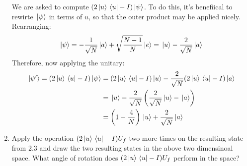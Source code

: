 \documentclass[10pt]{article}
\begin{document}
\begin{enumerate}[label=\alph*)]
			\begin{solution}
				We are asked to compute \( (2 \ket*{u}\bra*{u} - I) \ket*{\psi} \). To do this, it's benefiical 
				to rewirte \( \ket*{\psi} \) in terms of \( u \), so that the outer product may be applied nicely. 
				Rearranging:
				\[
				\ket*{\psi} = -\frac{1}{\sqrt{N} }\ket*{a} + \sqrt{\frac{N-1}{N}} \ket*{e}
				= \ket*{u} - \frac{2}{\sqrt{N} }\ket*{a}
				\] 
				Therefore, now applying the unitary:
				\begin{align*}
					\ket*{\psi'} = 
					(2 \ket*{u}\bra*{u} - I) \ket*{\psi} &= (2\ket*{u}\bra*{u} - I)\ket*{u} - \frac{2}{\sqrt{N} }
					(2\ket*{u}\bra*{u} - I)\ket*{a}\\
					&= \ket*{u} - \frac{2}{\sqrt{N} }\left(\frac{2}{\sqrt{N} }\ket*{u} - \ket*{a}\right)\\
					&= \left(1-\frac{4}{N}\right)\ket*{u} + \frac{2}{\sqrt{N} }\ket*{a} 
				\end{align*}
			\end{solution}
		\item Apply the operation \( (2\ket*{u}\bra*{u} - I) U_f \) two more times on the resulting state 
			from 2.3 and draw the two resulting states in the above two dimensinoal space. What angle of rotation does 
			\( (2\ket*{u}\bra*{u} - I)U_f \) perform in the space? 


\end{enumerate}
\end{document}
